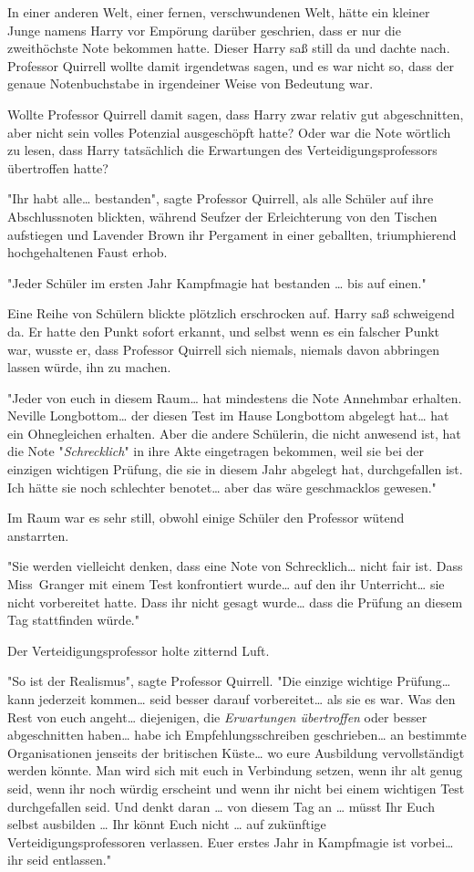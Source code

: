 {In einer anderen Welt, einer fernen, verschwundenen Welt, hätte ein kleiner Junge namens Harry vor Empörung darüber geschrien, dass er nur die zweithöchste Note bekommen hatte. Dieser Harry saß still da und dachte nach. Professor Quirrell wollte damit irgendetwas sagen, und es war nicht so, dass der genaue Notenbuchstabe in irgendeiner Weise von Bedeutung war.

Wollte Professor Quirrell damit sagen, dass Harry zwar relativ gut abgeschnitten, aber nicht sein volles Potenzial ausgeschöpft hatte? Oder war die Note wörtlich zu lesen, dass Harry tatsächlich die Erwartungen des Verteidigungsprofessors übertroffen hatte?

"Ihr habt alle… bestanden", sagte Professor Quirrell, als alle Schüler auf ihre Abschlussnoten blickten, während Seufzer der Erleichterung von den Tischen aufstiegen und Lavender Brown ihr Pergament in einer geballten, triumphierend hochgehaltenen Faust erhob.

"Jeder Schüler im ersten Jahr Kampfmagie hat bestanden … bis auf einen."

Eine Reihe von Schülern blickte plötzlich erschrocken auf. Harry saß schweigend da. Er hatte den Punkt sofort erkannt, und selbst wenn es ein falscher Punkt war, wusste er, dass Professor Quirrell sich niemals, niemals davon abbringen lassen würde, ihn zu machen.

"Jeder von euch in diesem Raum… hat mindestens die Note Annehmbar erhalten. Neville Longbottom… der diesen Test im Hause Longbottom abgelegt hat… hat ein Ohnegleichen erhalten. Aber die andere Schülerin, die nicht anwesend ist, hat die Note "\emph{Schrecklich}" in ihre Akte eingetragen bekommen, weil sie bei der einzigen wichtigen Prüfung, die sie in diesem Jahr abgelegt hat, durchgefallen ist. Ich hätte sie noch schlechter benotet… aber das wäre geschmacklos gewesen."

Im Raum war es sehr still, obwohl einige Schüler den Professor wütend anstarrten.

"Sie werden vielleicht denken, dass eine Note von Schrecklich… nicht fair ist. Dass Miss~Granger mit einem Test konfrontiert wurde… auf den ihr Unterricht… sie nicht vorbereitet hatte. Dass ihr nicht gesagt wurde… dass die Prüfung an diesem Tag stattfinden würde."

Der Verteidigungsprofessor holte zitternd Luft.

"So ist der Realismus", sagte Professor Quirrell. "Die einzige wichtige Prüfung… kann jederzeit kommen… seid besser darauf vorbereitet… als sie es war. Was den Rest von euch angeht… diejenigen, die \emph{Erwartungen übertroffen} oder besser abgeschnitten haben… habe ich Empfehlungsschreiben geschrieben… an bestimmte Organisationen jenseits der britischen Küste… wo eure Ausbildung vervollständigt werden könnte. Man wird sich mit euch in Verbindung setzen, wenn ihr alt genug seid, wenn ihr noch würdig erscheint und wenn ihr nicht bei einem wichtigen Test durchgefallen seid. Und denkt daran … von diesem Tag an … müsst Ihr Euch selbst ausbilden … Ihr könnt Euch nicht … auf zukünftige Verteidigungsprofessoren verlassen. Euer erstes Jahr in Kampfmagie ist vorbei… ihr seid entlassen."

}
